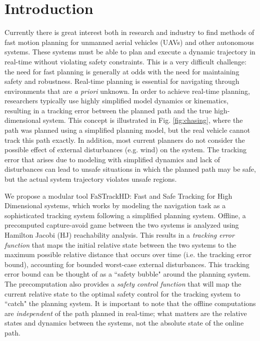 \section{Introduction}
 Currently there is great interest both in research and industry to find methods of fast motion planning for unmanned aerial vehicles (UAVs) and other autonomous systems. These systems must be able to plan and execute a dynamic trajectory in real-time without violating safety constraints. This is a very difficult challenge: the need for fast planning is generally at odds with the need for maintaining safety and robustness. Real-time planning is essential for navigating through environments that are \textit{a priori} unknown. In order to achieve real-time planning, researchers typically use highly simplified model dynamics or kinematics, resulting in a tracking error between the planned path and the true high-dimensional system. This concept is illustrated in Fig. \ref{fig:chasing}, where the path was planned using a simplified planning model, but the real vehicle cannot track this path exactly. In addition, most current planners do not consider the possible effect of external disturbances (e.g. wind) on the system. The tracking error that arises due to modeling with simplified dynamics and lack of disturbances can lead to unsafe situations in which the planned path may be safe, but the actual system trajectory violates unsafe regions.

We propose a modular tool FaSTrackHD: Fast and Safe Tracking for High Dimensional systems, which works by modeling the navigation task as a sophisticated tracking system following a simplified planning system. Offline, a precomputed capture-avoid game between the two systems is analyzed using Hamilton Jacobi (HJ) reachability analysis. This results in a \textit{tracking error function} that maps the initial relative state between the two systems to the maximum possible relative distance that occurs over time (i.e. the tracking error bound), accounting for bounded worst-case external disturbances. This tracking error bound can be thought of as a ``safety bubble" around the planning system. The precomputation also provides a \textit{safety control function} that will map the current relative state to the optimal safety control for the tracking system to ``catch" the planning system. It is important to note that the offline computations are \textit{independent} of the path planned in real-time; what matters are the relative states and dynamics between the systems, not the absolute state of the online path.

